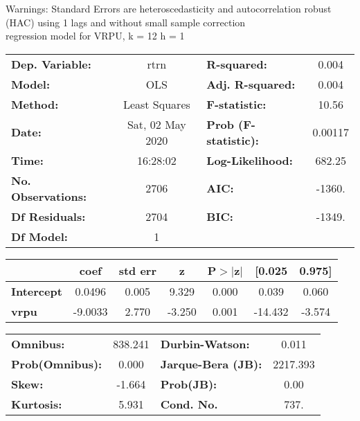 Warnings: \newline
 [1] Standard Errors are heteroscedasticity and autocorrelation robust (HAC) using 1 lags and without small sample correction\\ 

regression model for VRPU, k = 12 h = 1\begin{center}
\begin{tabular}{lclc}
\toprule
\textbf{Dep. Variable:}    &       rtrn       & \textbf{  R-squared:         } &     0.004   \\
\textbf{Model:}            &       OLS        & \textbf{  Adj. R-squared:    } &     0.004   \\
\textbf{Method:}           &  Least Squares   & \textbf{  F-statistic:       } &     10.56   \\
\textbf{Date:}             & Sat, 02 May 2020 & \textbf{  Prob (F-statistic):} &  0.00117    \\
\textbf{Time:}             &     16:28:02     & \textbf{  Log-Likelihood:    } &    682.25   \\
\textbf{No. Observations:} &        2706      & \textbf{  AIC:               } &    -1360.   \\
\textbf{Df Residuals:}     &        2704      & \textbf{  BIC:               } &    -1349.   \\
\textbf{Df Model:}         &           1      & \textbf{                     } &             \\
\bottomrule
\end{tabular}
\begin{tabular}{lcccccc}
                   & \textbf{coef} & \textbf{std err} & \textbf{z} & \textbf{P$> |$z$|$} & \textbf{[0.025} & \textbf{0.975]}  \\
\midrule
\textbf{Intercept} &       0.0496  &        0.005     &     9.329  &         0.000        &        0.039    &        0.060     \\
\textbf{vrpu}      &      -9.0033  &        2.770     &    -3.250  &         0.001        &      -14.432    &       -3.574     \\
\bottomrule
\end{tabular}
\begin{tabular}{lclc}
\textbf{Omnibus:}       & 838.241 & \textbf{  Durbin-Watson:     } &    0.011  \\
\textbf{Prob(Omnibus):} &   0.000 & \textbf{  Jarque-Bera (JB):  } & 2217.393  \\
\textbf{Skew:}          &  -1.664 & \textbf{  Prob(JB):          } &     0.00  \\
\textbf{Kurtosis:}      &   5.931 & \textbf{  Cond. No.          } &     737.  \\
\bottomrule
\end{tabular}
\end{center}

